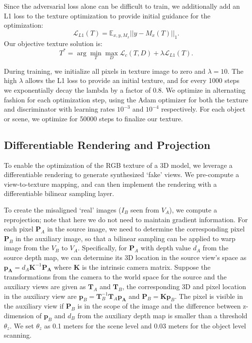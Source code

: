 %
Since the adversarial loss alone can be difficult to train, we additionally add an L1 loss to the texture optimization to provide initial guidance for the optimization:
%
\begin{equation}
\mathcal{L}_{L1}(T) = \mathbb{E}_{x,y,M_x} ||y - M_x(T)||_1.
\end{equation}
Our objective texture solution is:
\begin{equation}
    T^* = \arg \min_{T} \max_{D} \mathcal{L}_c(T,D) + \lambda \mathcal{L}_{L1}(T).
\end{equation}

%
During training, we initialize all pixels in texture image to zero and $\lambda=10$.
%
The high $\lambda$ allows the L1 loss to provide an initial texture, and for every 1000 steps we exponentially decay the lambda by a factor of $0.8$.
%
We optimize in alternating fashion for each optimization step, using the Adam optimizer for both the texture and discriminator with learning rates $10^{-3}$ and $10^{-4}$ respectively.
%
For each object or scene, we optimize for 50000 steps to finalize our texture. 
%

\subsection{Differentiable Rendering and Projection}
%
To enable the optimization of the RGB texture of a 3D model, we leverage a differentiable rendering to generate synthesized `fake' views.
We pre-compute a view-to-texture mapping, and can then implement the rendering with a differentiable bilinear sampling layer. 

To create the misaligned `real' images ($I_B$ seen from $V_A$), we compute a reprojection; note that here we do not need to maintain gradient information.
For each pixel $\mathbf{P}_A$ in the source image, we need to determine the corresponding pixel $\mathbf{P}_B$ in the auxiliary image, so that a bilinear sampling can be applied to warp image from the $V_B$ to $V_A$. 
Specifically, for $\mathbf{P}_A$ with depth value $d_A$ from the source depth map, we can determine its 3D location in the source view's space as $\mathbf{p_A}=d_A\mathbf{K}^{-1}\mathbf{P_A}$ where $\mathbf{K}$ is the intrinsic camera matrix. 
Suppose the transformations from the camera to the world space for the source and the auxiliary views are given as $\mathbf{T}_A$ and $\mathbf{T}_B$, the corresponding 3D and pixel location in the auxiliary view are $\mathbf{p}_B=\mathbf{T}_B^{-1}\mathbf{T}_A\mathbf{p_A}$ and $\mathbf{P}_B=\mathbf{K}\mathbf{p}_B$. 
The pixel is visible in the auxiliary view if $\mathbf{P}_B$ is in the scope of the image and the difference between z-dimension of $\mathbf{p}_B$ and $d_B$ from the auxiliary depth map is smaller than a threshold $\theta_z$. We set $\theta_z$ as 0.1 meters for the scene level and 0.03 meters for the object level scanning.

